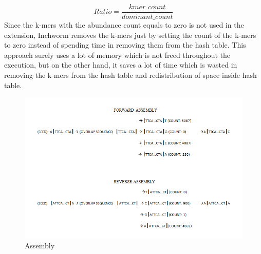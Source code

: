 \label{key}\documentclass[plainarticle, english ,zihtitle,final,hyperref,utf8]{zihpub}
\begin{document}
\begin{equation}
Ratio = \frac{kmer\_count}{dominant\_count}
\label{eq2}
\end{equation}
Since the k-mers with the abundance count equals to zero is not used in the extension, Inchworm removes the k-mers just by setting the count of the k-mers to zero instead of spending time in removing them from the hash table. This approach surely uses a lot of memory which is not freed throughout the execution, but on the other hand, it saves a lot of time which is wasted in removing the k-mers from the hash table and redistribution of space inside hash table.
\begin{figure}[h]
\center
\includegraphics[scale=0.7]{assembly}
\caption{Assembly}
\label{assemble}
\end{figure}
\end{document}
